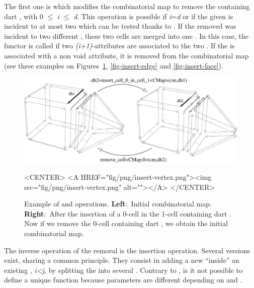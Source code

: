 The first one is  which modifies the
combinatorial map to remove the  containing dart ,
with 0 $\leq$ \emph{i} $\leq$ \emph{d}. This operation is possible if \emph{i}=\emph{d} or if the given
 is incident to at most two  which can be tested
thanks to .  If the removed 
was incident to two different , these two cells are
merged into one . In this case, the  functor
is called if two \emph{(i+1)}-attributes are associated to the two
.  If the  is associated with a non void
attribute, it is removed from the combinatorial map  (see three
examples on Figures~\ref{fig-insert-vertex}, \ref{fig-insert-edge} and
\ref{fig-insert-face}).
\begin{figure}[htb]
  \begin{ccTexOnly}
    \begin{center}
      \includegraphics[width=.75\textwidth]{Combinatorial_map/fig/pdf/insert-vertex}
    \end{center}
  \end{ccTexOnly}
  \begin{ccHtmlOnly}
    <CENTER> <A HREF="fig/png/insert-vertex.png"><img
    src="fig/png/insert-vertex.png" alt=""></A> </CENTER>
  \end{ccHtmlOnly}
  \caption{Example of  and
     operations. \textbf{Left}:~Initial
    combinatorial map.  \textbf{Right}:~After the insertion of a
    0-cell in the 1-cell containing dart .  Now if we remove
    the 0-cell containing dart , we obtain the initial
    combinatorial map.}
  \label{fig-insert-vertex}
\end{figure}

The inverse operation of the removal is the insertion operation.
Several versions exist, sharing a common principle. They consist in
adding a new  ``inside'' an existing , \emph{i<j}, by
splitting the  into several .  Contrary to
, is it not possible to define a unique
 function because parameters
are different depending on  and .

